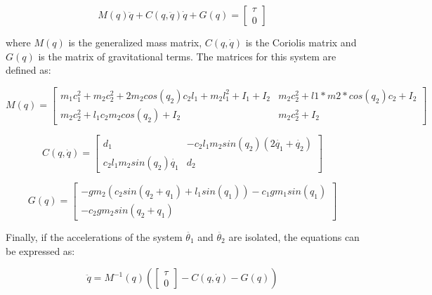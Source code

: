 \documentclass[main.tex]{subfiles}
\begin{document}
\begin{equation}
M(q)\ddot{q} + C(q,\ddot{q}) \dot{q} + G(q)=
\begin{bmatrix}
\tau \\
0
\end{bmatrix}
\end{equation}

where $M(q)$  is the generalized mass matrix, $C(q,\dot{q})$  is the Coriolis matrix and $G(q)$  is the matrix of gravitational terms. The matrices for this system are defined as:

\begin{equation*}
M(q)=
\begin{bmatrix}
m_1 c_1^2 + m_2 c_2^2 + 2 m_2 cos(q_2) c_2 l_1 + m_2 l_1^2 + I_1 + I_2 & m_2 c_2^2 + l1*m2*cos(q_2) c_2 + I_2 \\
m_2 c_2^2 + l_1 c_2 m_2 cos(q_2)  + I_2 & m_2 c_2^2 + I_2
\end{bmatrix}
\end{equation*}

\begin{equation*}
C(q,\dot{q})=
\begin{bmatrix}
d_1 & -c_2 l_1 m_2 sin(q_2)(2 \dot{q_1} + \dot{q_2} ) \\
c_2 l_1 m_2 sin(q_2) \dot{q_1} & d_2
\end{bmatrix}
\end{equation*}

\begin{equation*}
G(q)=
\begin{bmatrix}
-g m_2 (c_2 sin(q_2 + q_1) + l_1 sin(q_1)) - c_1 g m_1 sin(q_1) \\
-c_2 g m_2 sin(q_2 + q_1)
\end{bmatrix}
\end{equation*}

Finally, if the accelerations of the system $\ddot{\theta_1}$ and $\ddot{\theta_2}$ are isolated, the equations can be expressed as:

\begin{equation}\label{eq:eqom}
\ddot{q} = M^{-1}(q)\left(\begin{bmatrix}
\tau \\ 0
\end{bmatrix}  - C(q,\dot{q})- G(q)\right)
\end{equation}
\end{document}
